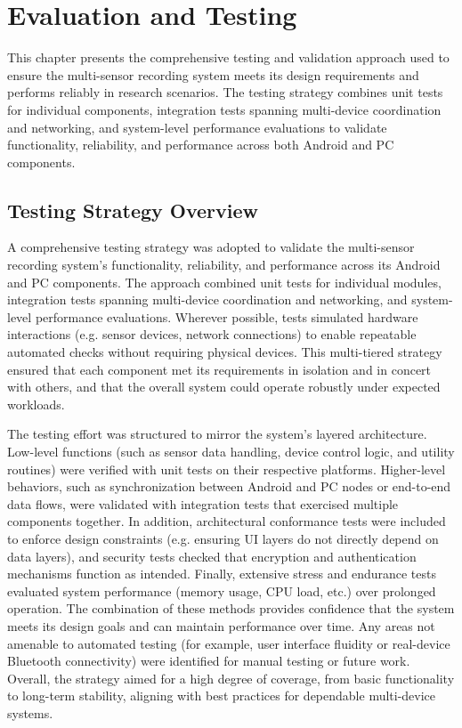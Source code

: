 \documentclass[11pt,a4paper]{report}
\begin{document}
\label{chap:5}

\chapter{Evaluation and Testing}

This chapter presents the comprehensive testing and validation approach used to ensure the multi-sensor recording system meets its design requirements and performs reliably in research scenarios. The testing strategy combines unit tests for individual components, integration tests spanning multi-device coordination and networking, and system-level performance evaluations to validate functionality, reliability, and performance across both Android and PC components.

\section{Testing Strategy Overview}

A comprehensive testing strategy was adopted to validate the multi-sensor recording system's functionality, reliability, and performance across its Android and PC components. The approach combined unit tests for individual modules, integration tests spanning multi-device coordination and networking, and system-level performance evaluations. Wherever possible, tests simulated hardware interactions (e.g. sensor devices, network connections) to enable repeatable automated checks without requiring physical devices. This multi-tiered strategy ensured that each component met its requirements in isolation and in concert with others, and that the overall system could operate robustly under expected workloads.

The testing effort was structured to mirror the system's layered architecture. Low-level functions (such as sensor data handling, device control logic, and utility routines) were verified with unit tests on their respective platforms. Higher-level behaviors, such as synchronization between Android and PC nodes or end-to-end data flows, were validated with integration tests that exercised multiple components together. In addition, architectural conformance tests were included to enforce design constraints (e.g. ensuring UI layers do not directly depend on data layers), and security tests checked that encryption and authentication mechanisms function as intended. Finally, extensive stress and endurance tests evaluated system performance (memory usage, CPU load, etc.) over prolonged operation. The combination of these methods provides confidence that the system meets its design goals and can maintain performance over time. Any areas not amenable to automated testing (for example, user interface fluidity or real-device Bluetooth connectivity) were identified for manual testing or future work. Overall, the strategy aimed for a high degree of coverage, from basic functionality to long-term stability, aligning with best practices for dependable multi-device systems.
\end{document}
